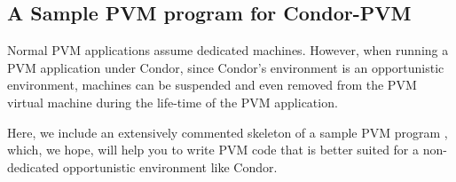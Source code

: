 \subsection{A Sample PVM program for Condor-PVM}

Normal PVM applications assume dedicated machines.  However, when running a
PVM application under Condor, since Condor's environment is an
opportunistic environment, machines can be suspended and even removed
from the PVM virtual machine during the life-time of the PVM
application.  

Here, we include an extensively commented skeleton of a sample PVM
program , which, we hope, will help you to
write PVM code that is better suited for a non-dedicated opportunistic
environment like Condor.

